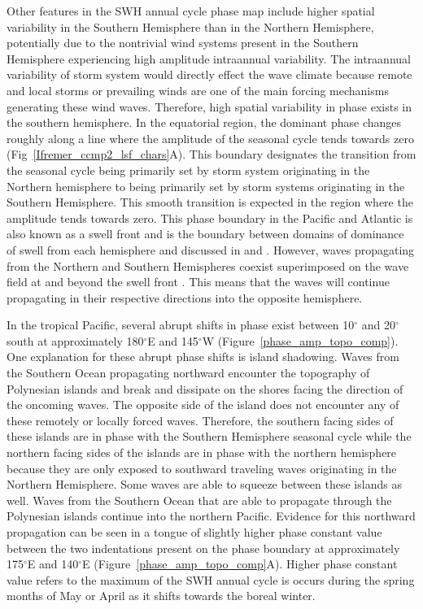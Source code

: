 \documentclass[12pt,twoside]{article}
\begin{document}
Other features in the SWH annual cycle phase map include higher spatial variability in the Southern Hemisphere than in the Northern Hemisphere, potentially due to the nontrivial wind systems present in the Southern Hemisphere experiencing high amplitude intraannual variability. The intraannual variability of storm system would directly effect the wave climate because remote and local storms or prevailing winds are one of the main forcing mechanisms generating these wind waves. Therefore, high spatial variability in phase exists in the southern hemisphere. In the equatorial region, the dominant phase changes roughly along a line where the amplitude of the seasonal cycle tends towards zero (Fig~\ref{Ifremer_ccmp2_lsf_chars}A). This boundary designates the transition from the seasonal cycle being primarily set by storm system originating in the Northern hemisphere to being primarily set by storm systems originating in the Southern Hemisphere. This smooth transition is expected in the region where the amplitude tends towards zero. This phase boundary in the Pacific and Atlantic is also known as a swell front \cite{young1999seasonal} and is the boundary between domains of dominance of swell from each hemisphere and discussed in \citet{semedo2011global} and \citet{jiang2013global}. However, waves propagating from the Northern and Southern Hemispheres coexist superimposed on the wave field at and beyond the swell front \cite{echevarria2019seasonal}. This means that the waves will continue propagating in their respective directions into the opposite hemisphere.

In the tropical Pacific, several abrupt shifts in phase exist between 10$^{\circ}$ and 20$^{\circ}$ south at approximately 180$^{\circ}$E and 145$^{\circ}$W (Figure~\ref{phase_amp_topo_comp}). One explanation for these abrupt phase shifts is island shadowing. Waves from the Southern Ocean propagating northward encounter the topography of Polynesian islands and break and dissipate on the shores facing the direction of the oncoming waves. The opposite side of the island does not encounter any of these remotely or locally forced waves. Therefore, the southern facing sides of these islands are in phase with the Southern Hemisphere seasonal cycle while the northern facing sides of the islands are in phase with the northern hemisphere because they are only exposed to southward traveling waves originating in the Northern Hemisphere. Some waves are able to squeeze between these islands as well. Waves from the Southern Ocean that are able to propagate through the Polynesian islands continue into the northern Pacific. Evidence for this northward propagation can be seen in a tongue of slightly higher phase constant value between the two indentations present on the phase boundary at approximately 175$^{\circ}$E and 140$^{\circ}$E (Figure~\ref{phase_amp_topo_comp}A). Higher phase constant value refers to the maximum of the SWH annual cycle is occurs during the spring months of May or April as it shifts towards the boreal winter. 
\end{document}
